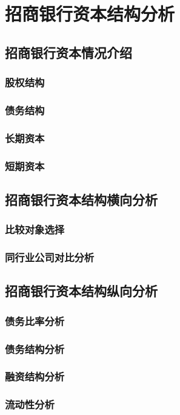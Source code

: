 \chapter{招商银行资本结构分析}

\section{招商银行资本情况介绍}
\subsection{股权结构}
\subsection{债务结构}
\subsection{长期资本}
\subsection{短期资本}

\section{招商银行资本结构横向分析}
\subsection{比较对象选择}
\subsection{同行业公司对比分析}

\section{招商银行资本结构纵向分析}
\subsection{债务比率分析}
\subsection{债务结构分析}
\subsection{融资结构分析}
\subsection{流动性分析}


